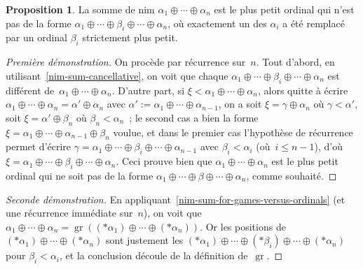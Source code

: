 \documentclass[12pt,a4paper]{article}
\theoremstyle{definition}
\newtheorem{prop}[comcnt]{Proposition}
\newcommand{\gr}{\operatorname{gr}}
\begin{document}
\begin{prop}\label{nim-sum-multiple-sum}
La somme de nim $\alpha_1\oplus\cdots\oplus\alpha_n$ est le plus petit
ordinal qui n'est pas de la forme
$\alpha_1\oplus\cdots\oplus\beta_i\oplus \cdots\oplus\alpha_n$, où
exactement un des $\alpha_i$ a été remplacé par un ordinal $\beta_i$
strictement plus petit.
\end{prop}
\begin{proof}[Première démonstration]
On procède par récurrence sur $n$.  Tout d'abord, en
utilisant \ref{nim-sum-cancellative}, on voit que chaque $\alpha_1
\oplus \cdots \oplus \beta_i \oplus \cdots \oplus \alpha_n$ est
différent de $\alpha_1 \oplus \cdots \oplus \alpha_n$.  D'autre part,
si $\xi < \alpha_1 \oplus \cdots \oplus \alpha_n$, alors quitte à
écrire $\alpha_1 \oplus \cdots \oplus \alpha_n = \alpha' \oplus
\alpha_n$ avec $\alpha' := \alpha_1 \oplus \cdots \oplus
\alpha_{n-1}$, on a soit $\xi = \gamma \oplus \alpha_n$ où $\gamma <
\alpha'$, soit $\xi = \alpha' \oplus \beta_n$ où $\beta_n <
\alpha_n$ ; le second cas a bien la forme $\xi = \alpha_1 \oplus
\cdots \oplus \alpha_{n-1} \oplus \beta_n$ voulue, et dans le premier
cas l'hypothèse de récurrence permet d'écrire $\gamma = \alpha_1
\oplus \cdots \oplus \beta_i \oplus \cdots \oplus \alpha_{n-1}$ avec
$\beta_i < \alpha_i$ (où $i\leq n-1$), d'où $\xi = \alpha_1 \oplus
\cdots \oplus \beta_i \oplus \cdots \oplus \alpha_n$.  Ceci prouve
bien que $\alpha_1 \oplus \cdots \oplus \alpha_n$ est le plus petit
ordinal qui ne soit pas de la forme $\alpha_1 \oplus \cdots \oplus
\beta \oplus \cdots \oplus \alpha_n$, comme souhaité.
\end{proof}
\begin{proof}[Seconde démonstration]
En appliquant \ref{nim-sum-for-games-versus-ordinals} (et une
récurrence immédiate sur $n$), on voit que
$\alpha_1\oplus\cdots\oplus\alpha_n =
\gr((*\alpha_1)\oplus\cdots\oplus(*\alpha_n))$.  Or les positions de
$(*\alpha_1)\oplus\cdots\oplus(*\alpha_n)$ sont justement les
$(*\alpha_1)\oplus\cdots\oplus(*\beta_i)\oplus
\cdots\oplus(*\alpha_n)$ pour $\beta_i < \alpha_i$, et la conclusion
découle de la définition de $\gr$.
\end{proof}
\end{document}
